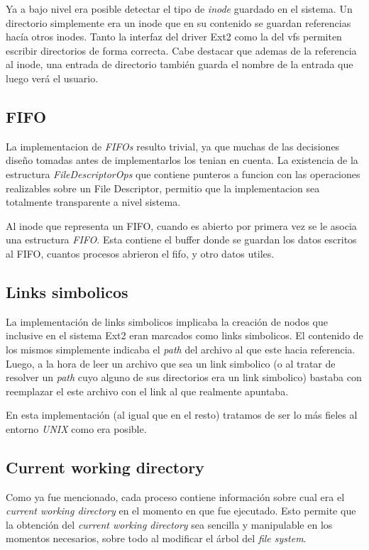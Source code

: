 \documentclass[a4paper,10pt]{article}
\begin{document}
Ya a bajo nivel era posible detectar el tipo de \textit{inode} guardado en el sistema. Un directorio simplemente era
un inode que en su contenido se guardan referencias hacía otros inodes. Tanto la interfaz del driver Ext2 como la del
vfs permiten escribir directorios de forma correcta. Cabe destacar que ademas de la referencia al inode, una entrada
de directorio también guarda el nombre de la entrada que luego verá el usuario.

\subsection{FIFO}
La implementacion de \textit{FIFOs} resulto trivial, ya que muchas de las decisiones diseño tomadas antes de implementarlos los tenian en cuenta.
La existencia de la estructura \textit{FileDescriptorOps} que contiene punteros a funcion con las operaciones realizables sobre un File Descriptor, permitio que la implementacion sea totalmente transparente a nivel sistema.

Al inode que representa un FIFO, cuando es abierto por primera vez se le asocia una estructura \textit{FIFO}.
Esta contiene el buffer donde se guardan los datos escritos al FIFO, cuantos procesos abrieron el fifo, y otro datos utiles.


\subsection{Links simbolicos}
La implementación de links simbolicos implicaba la creación de nodos que inclusive en el sistema Ext2 eran marcados
como links simbolicos. El contenido de los mismos simplemente indicaba el \textit{path} del archivo al que este
hacia referencia.
Luego, a la hora de leer un archivo que sea un link simbolico (o al tratar de resolver un \textit{path} cuyo alguno
de sus directorios era un link simbolico) bastaba con reemplazar el este archivo con el link al que realmente
apuntaba.

En esta implementación (al igual que en el resto) tratamos de ser lo más fieles al entorno \textit{UNIX} como 
era posible.

\subsection{Current working directory}
    
Como ya fue mencionado, cada proceso contiene información sobre cual era el \textit{current working directory} en
el momento en que fue ejecutado. Esto permite que la obtención del \textit{current working directory} sea sencilla
y manipulable en los momentos necesarios, sobre todo al modificar el árbol del \textit{file system}.
\end{document}
